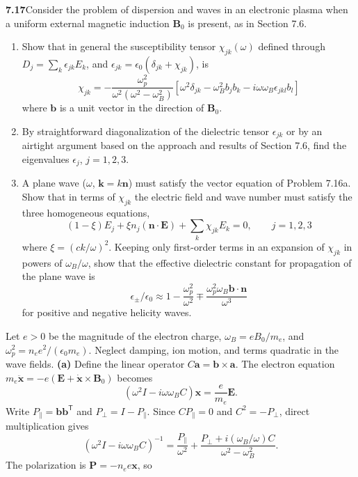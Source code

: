 \par\bigskip
\noindent\textbf{7.17}\quad Consider the problem of dispersion and waves in an electronic plasma when a uniform external magnetic induction $\mathbf{B}_{0}$ is present, as in Section 7.6.
\begin{enumerate}
\item[(a)] Show that in general the susceptibility tensor $\chi_{jk}(\omega)$ defined through $D_{j}=\sum_{k}\epsilon_{jk}E_{k}$, and $\epsilon_{jk}=\epsilon_{0}(\delta_{jk}+\chi_{jk})$, is
\[
\chi_{jk}=-\frac{\omega_{p}^{2}}{\omega^{2}(\omega^{2}-\omega_{B}^{2})}\left[\omega^{2}\delta_{jk}-\omega_{B}^{2}b_{j}b_{k}-i\omega\omega_{B}\epsilon_{jkl}b_{l}\right]
\]
where $\mathbf{b}$ is a unit vector in the direction of $\mathbf{B}_{0}$.
\item[(b)] By straightforward diagonalization of the dielectric tensor $\epsilon_{jk}$ or by an airtight argument based on the approach and results of Section 7.6, find the eigenvalues $\epsilon_{j}$, $j=1,2,3$.
\item[(c)] A plane wave ($\omega$, $\mathbf{k}=k\mathbf{n}$) must satisfy the vector equation of Problem 7.16a. Show that in terms of $\chi_{jk}$ the electric field and wave number must satisfy the three homogeneous equations,
\[
(1-\xi)E_{j}+\xi n_{j}(\mathbf{n}\cdot\mathbf{E})+\sum_{k}\chi_{jk}E_{k}=0,\qquad j=1,2,3
\]
where $\xi=(ck/\omega)^{2}$. Keeping only first-order terms in an expansion of $\chi_{jk}$ in powers of $\omega_{B}/\omega$, show that the effective dielectric constant for propagation of the plane wave is
\[
\epsilon_{\pm}/\epsilon_{0}\approx1-\frac{\omega_{p}^{2}}{\omega^{2}}\mp\frac{\omega_{p}^{2}\omega_{B}\mathbf{b}\cdot\mathbf{n}}{\omega^{3}}
\]
for positive and negative helicity waves.
\end{enumerate}
\solution
Let $e>0$ be the magnitude of the electron charge,
$\omega_B=eB_0/m_e$, and $\omega_p^2=n_e e^2/(\epsilon_0m_e)$.
Neglect damping, ion motion, and terms quadratic in the wave fields.
\textbf{(a)} Define the linear operator $C\mathbf a=\mathbf b\times\mathbf a$.
The electron equation $m_e\ddot{\mathbf x}=-e(\mathbf E+
\dot{\mathbf x}\times\mathbf B_0)$ becomes
\[
(\omega^2 I-i\omega\omega_B C)\mathbf x=\frac e{m_e}\mathbf E.
\]
Write $P_\parallel=\mathbf b\mathbf b^{\mathsf T}$ and
$P_\perp=I-P_\parallel$. Since $CP_\parallel=0$ and
$C^2=-P_\perp$, direct multiplication gives
\[
(\omega^2 I-i\omega\omega_BC)^{-1}
=\frac{P_\parallel}{\omega^2}
+\frac{P_\perp+i(\omega_B/\omega)C}{\omega^2-\omega_B^2}.
\]
The polarization is $\mathbf P=-n_e e\mathbf x$, so
